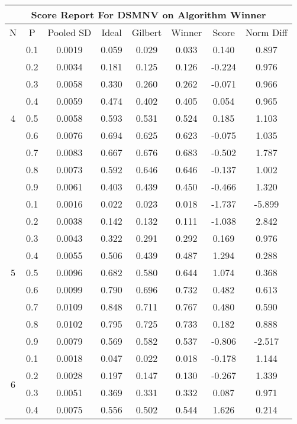 \documentclass[11pt,a4paper]{report}
\begin{document}
\begin{longtable}{ | c | c || c | c | c | c | c | c | }
\hline
\multicolumn{8}{|c|}{ Score Report For DSMNV on Algorithm Winner} \\
\hline
N & P & Pooled SD &  Ideal &  Gilbert & Winner  & Score & Norm Diff \\
 \hline
 \hline
 \endhead
\multirow{9}{*}{4} & 0.1 & 0.0019 & 0.059 & 0.029 & 0.033 & 0.140 & 0.897 \\
 & 0.2 & 0.0034 & 0.181 & 0.125 & 0.126 & -0.224 & 0.976 \\
 & 0.3 & 0.0058 & 0.330 & 0.260 & 0.262 & -0.071 & 0.966 \\
 & 0.4 & 0.0059 & 0.474 & 0.402 & 0.405 & 0.054 & 0.965 \\
 & 0.5 & 0.0058 & 0.593 & 0.531 & 0.524 & 0.185 & 1.103 \\
 & 0.6 & 0.0076 & 0.694 & 0.625 & 0.623 & -0.075 & 1.035 \\
 & 0.7 & 0.0083 & 0.667 & 0.676 & 0.683 & -0.502 & 1.787 \\
 & 0.8 & 0.0073 & 0.592 & 0.646 & 0.646 & -0.137 & 1.002 \\
 & 0.9 & 0.0061 & 0.403 & 0.439 & 0.450 & -0.466 & 1.320 \\
 \hline
\multirow{9}{*}{5} & 0.1 & 0.0016 & 0.022 & 0.023 & 0.018 & -1.737 & -5.899 \\
 & 0.2 & 0.0038 & 0.142 & 0.132 & 0.111 & -1.038 & 2.842 \\
 & 0.3 & 0.0043 & 0.322 & 0.291 & 0.292 & 0.169 & 0.976 \\
 & 0.4 & 0.0055 & 0.506 & 0.439 & 0.487 & 1.294 & 0.288 \\
 & 0.5 & 0.0096 & 0.682 & 0.580 & 0.644 & 1.074 & 0.368 \\
 & 0.6 & 0.0099 & 0.790 & 0.696 & 0.732 & 0.482 & 0.613 \\
 & 0.7 & 0.0109 & 0.848 & 0.711 & 0.767 & 0.480 & 0.590 \\
 & 0.8 & 0.0102 & 0.795 & 0.725 & 0.733 & 0.182 & 0.888 \\
 & 0.9 & 0.0079 & 0.569 & 0.582 & 0.537 & -0.806 & -2.517 \\
 \hline
\multirow{9}{*}{6} & 0.1 & 0.0018 & 0.047 & 0.022 & 0.018 & -0.178 & 1.144 \\
 & 0.2 & 0.0028 & 0.197 & 0.147 & 0.130 & -0.267 & 1.339 \\
 & 0.3 & 0.0051 & 0.369 & 0.331 & 0.332 & 0.087 & 0.971 \\
 & 0.4 & 0.0075 & 0.556 & 0.502 & 0.544 & 1.626 & 0.214 \\

\end{longtable}
\end{document}
